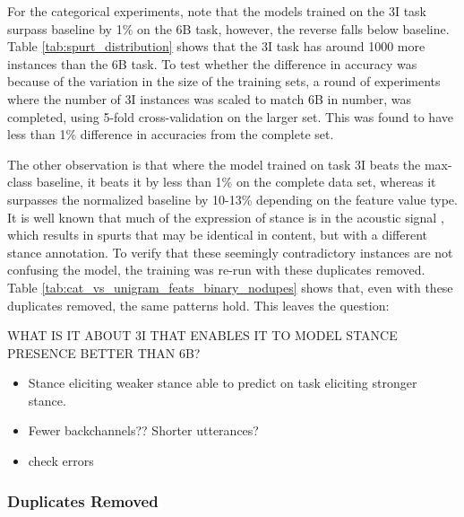For the categorical experiments, note that the models trained on the 3I task surpass baseline by 1\% on the 6B task, however, the reverse falls below baseline.  Table \ref{tab:spurt_distribution} shows that the 3I task has around 1000 more instances than the 6B task.  To test whether the difference in accuracy was because of the variation in the size of the training sets, a round of experiments where the number of 3I instances was scaled to match 6B in number, was completed, using 5-fold cross-validation on the larger set.  This was found to have less than 1\% difference in accuracies from the complete set.     

The other observation is that where the model trained on task 3I beats the max-class baseline, it beats it by less than 1\% on the complete data set, whereas it surpasses the normalized baseline by 10-13\% depending on the feature value type.  It is well known that much of the expression of stance is in the acoustic signal \citep{freeman2015phonetics}, which results in spurts that may be identical in content, but with a different stance annotation.  To verify that these seemingly contradictory instances are not confusing the model, the training was re-run with these duplicates removed.  Table \ref{tab:cat_vs_unigram_feats_binary_nodupes} shows that, even with these duplicates removed, the same patterns hold.  This leaves the question:

WHAT IS IT ABOUT 3I THAT ENABLES IT TO MODEL STANCE PRESENCE BETTER THAN 6B?  
\begin{itemize}
	\item Stance eliciting weaker stance able to predict on task eliciting stronger stance.
	\item Fewer backchannels??  Shorter utterances?  
	\item check errors
\end{itemize}

 
\subsubsection*{Duplicates Removed} 

